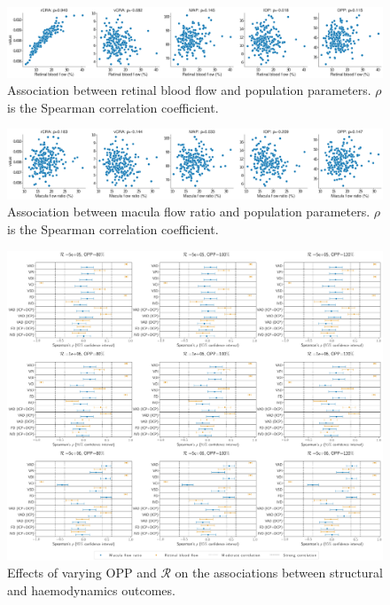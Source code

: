 \documentclass[11pt,]{article}
\begin{document}
\begin{figure}[ht!]
  \centering
  \includegraphics[width=.95\textwidth]{ParametersVP-To-TRBF}
  \caption{Association between retinal blood flow and population parameters. $\rho$ is the Spearman correlation coefficient.}
  \label{fig:sup-TRBF}
\end{figure}

\begin{figure}[ht!]
  \centering
  \includegraphics[width=.95\textwidth]{ParametersVP-To-MFR}
  \caption{Association between macula flow ratio and population parameters. $\rho$ is the Spearman correlation coefficient.}
  \label{fig:sup-MFR}
\end{figure}

\begin{figure}[ht!]
  \centering
  \includegraphics[width=\textwidth]{UQ_SpearmanCoefficients}
  \caption{\label{fig:sup-UQ-Coefficients}Effects of varying OPP and $\mathcal R$ on the associations between structural and haemodynamics outcomes.}
\end{figure}
\end{document}
